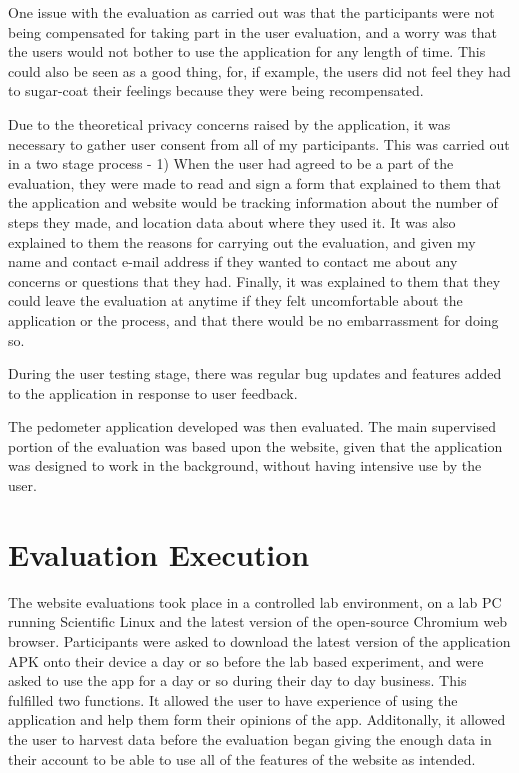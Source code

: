 \documentclass{l4proj}
\begin{document}
One issue with the evaluation as carried out was that the participants were not being compensated for taking part in the user evaluation, and a worry was that the users would not bother to use the application for any length of time. This could also be seen as a good thing, for, if example, the users did not feel they had to sugar-coat their feelings because they were being recompensated.
 
Due to the theoretical privacy concerns raised by the application, it was necessary to gather user consent from all of my participants. This was carried out in a two stage process - 1) When the user had agreed to be a part of the evaluation, they were made to read and sign a form that explained to them that the application and website would be tracking information about the number of steps they made, and location data about where they used it. It was also explained to them the reasons for carrying out the evaluation, and given my name and contact e-mail address if they wanted to contact me about any concerns or questions that they had. Finally, it was explained to them that they could leave the evaluation at anytime if they felt uncomfortable about the application or the process, and that there would be no embarrassment for doing so.

During the user testing stage, there was regular bug updates and features added to the application in response to user feedback.

The pedometer application developed was then evaluated. The main supervised portion of the evaluation was based upon the website, given that the application was designed to work in the background, without having intensive use by the user.

\section{Evaluation Execution}

The website evaluations took place in a controlled lab environment, on a lab PC running Scientific Linux and the latest version of the open-source Chromium web browser. Participants were asked to download the latest version of the application APK onto their device a day or so before the lab based experiment, and were asked to use the app for a day or so during their day to day business. This fulfilled two functions. It allowed the user to have experience of using the application and help them form their opinions of the app. Additonally, it allowed the user to harvest data before the evaluation began giving the enough data in their account to be able to use all of the features of the website as intended.
\end{document}

